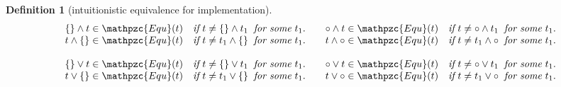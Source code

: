 \documentclass[12pt]{article}
\newtheorem{Definition}{Definition}[section]
\begin{document}
\begin{Definition}[intuitionistic equivalence for implementation]
\begin{displaymath}
\begin{array}{c}
      \begin{array}{ll}
        \begin{array}{l}
          \{\} \wedge t \in \mathpzc{Equ}(t)\quad \text{\it if}\ t \neq \{\}
           \wedge t_1\;\; \text{\it for some}\ t_1.  \\
          
          t \wedge \{\} \in \mathpzc{Equ}(t)\quad \text{\it if}\ t \neq t_1
           \wedge \{\}\;\; \text{\it for some}\ t_1.  \\
        \end{array}
        & \begin{array}{l}
            \circ \wedge t \in \mathpzc{Equ}(t)\quad \text{\it if}\
             t \neq \circ \wedge t_1\;\; \text{\it for some}\ t_1.  \\
             
             t \wedge \circ \in \mathpzc{Equ}(t)\quad \text{\it if}\
              t \neq t_1 \wedge \circ\;\; \text{\it for some}\ t_1.  \\
          \end{array}
      \end{array}  \\
      \\

      \begin{array}{ll}
        \begin{array}{l}
          \{\} \vee t \in \mathpzc{Equ}(t)\quad \text{\it if}\ t \neq \{\}
           \vee t_1\;\; \text{\it for some}\ t_1.  \\
          
           t \vee \{\} \in \mathpzc{Equ}(t)\quad \text{\it if}\ t \neq t_1
            \vee \{\}\;\; \text{\it for some}\ t_1.  \\
        \end{array}
        & \begin{array}{l}
            \circ \vee t \in \mathpzc{Equ}(t)\quad \text{\it if}\
             t \neq \circ \vee t_1\;\; \text{\it for some}\ t_1.  \\
             
             t \vee \circ \in \mathpzc{Equ}(t)\quad \text{\it if}\
             t \neq t_1 \vee \circ\;\; \text{\it for some}\ t_1.
          \end{array}
      \end{array}  \\   
      \\
      

\end{array}
\end{displaymath}
\end{Definition}
\end{document}
